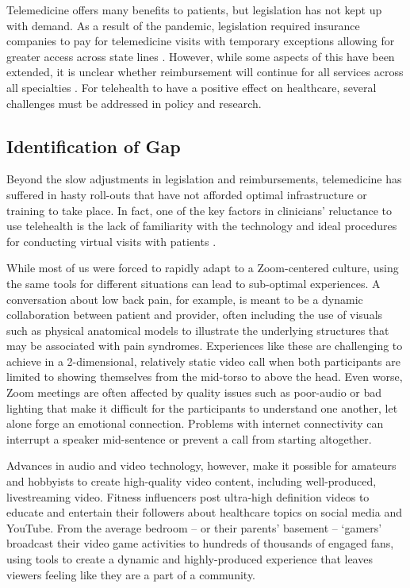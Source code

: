 \documentclass[utf8]{FrontiersinHarvard} %
\begin{document}
Telemedicine offers many benefits to patients, but legislation has not kept up with demand. As a result of the pandemic, legislation required insurance companies to pay for telemedicine visits with temporary exceptions allowing for greater access across state lines \citep{barberioTransitioningTelehealthTodays2021}. However, while some aspects of this have been extended, it is unclear whether reimbursement will continue for all services across all specialties \citep{TelehealthHereStay2021}. For telehealth to have a positive effect on healthcare, several challenges must be addressed in policy and research.

\subsection{Identification of Gap}

Beyond the slow adjustments in legislation and reimbursements, telemedicine has suffered in hasty roll-outs that have not afforded optimal infrastructure or training to take place. In fact, one of the key factors in clinicians' reluctance to use telehealth is the lack of familiarity with the technology and ideal procedures for conducting virtual visits with patients \citep{daviesInternationalCoreCapability2021}.

While most of us were forced to rapidly adapt to a Zoom-centered culture, using the same tools for different situations can lead to sub-optimal experiences. A conversation about low back pain, for example, is meant to be a dynamic collaboration between patient and provider, often including the use of visuals such as physical anatomical models to illustrate the underlying structures that may be associated with pain syndromes. Experiences like these are challenging to achieve in a 2-dimensional, relatively static video call when both participants are limited to showing themselves from the mid-torso to above the head. Even worse, Zoom meetings are often affected by quality issues such as poor-audio or bad lighting that make it difficult for the participants to understand one another, let alone forge an emotional connection. Problems with internet connectivity can interrupt a speaker mid-sentence or prevent a call from starting altogether.

Advances in audio and video technology, however, make it possible for amateurs and hobbyists to create high-quality video content, including well-produced, livestreaming video. Fitness influencers post ultra-high definition videos to educate and entertain their followers about healthcare topics on social media and YouTube. From the average bedroom -- or their parents' basement -- `gamers' broadcast their video game activities to hundreds of thousands of engaged fans, using tools to create a dynamic and highly-produced experience that leaves viewers feeling like they are a part of a community.
\end{document}

